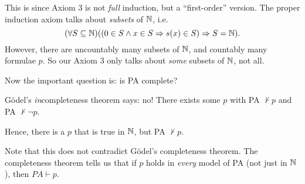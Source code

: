 \documentclass[a4paper]{article}
\begin{document}
This is since Axiom 3 is not \emph{full} induction, but a ``first-order'' version. The proper induction axiom talks about \emph{subsets} of $\mathbb{N}$, i.e.
\[
  (\forall S\subseteq \mathbb{N} )((0 \in S \wedge x\in S \Rightarrow s(x)\in S)\Rightarrow S=\mathbb{N}).
\]
However, there are uncountably many subsets of $\mathbb{N}$, and countably many formulae $p$. So our Axiom 3 only talks about \emph{some} subsets of $\mathbb{N}$, not all.

Now the important question is: is PA complete?

G\"odel's \emph{in}completeness theorem says: no! There exists some $p$ with PA $\not\vdash p$ and PA $\not\vdash \neg p$.

Hence, there is a $p$ that is true in $\mathbb{N}$, but PA $\not\vdash p$.

Note that this does not contradict G\"odel's completeness theorem. The completeness theorem tells us that if $p$ holds in \emph{every} model of PA (not just in $\mathbb{N}$), then $PA\vdash p$.
\end{document}

